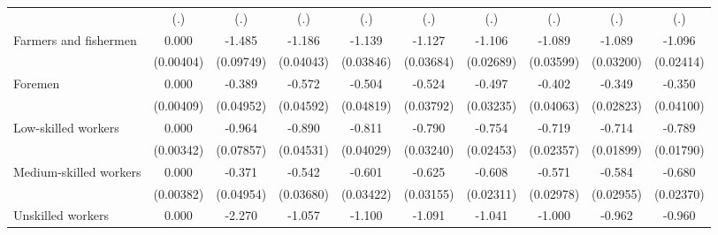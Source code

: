 {\begin{tabular}{l*{9}{c}}
                    &         (.)         &         (.)         &         (.)         &         (.)         &         (.)         &         (.)         &         (.)         &         (.)         &         (.)         \\
Farmers and fishermen&       0.000         &      -1.485\sym{***}&      -1.186\sym{***}&      -1.139\sym{***}&      -1.127\sym{***}&      -1.106\sym{***}&      -1.089\sym{***}&      -1.089\sym{***}&      -1.096\sym{***}\\
                    &   (0.00404)         &   (0.09749)         &   (0.04043)         &   (0.03846)         &   (0.03684)         &   (0.02689)         &   (0.03599)         &   (0.03200)         &   (0.02414)         \\
Foremen             &       0.000         &      -0.389\sym{***}&      -0.572\sym{***}&      -0.504\sym{***}&      -0.524\sym{***}&      -0.497\sym{***}&      -0.402\sym{***}&      -0.349\sym{***}&      -0.350\sym{***}\\
                    &   (0.00409)         &   (0.04952)         &   (0.04592)         &   (0.04819)         &   (0.03792)         &   (0.03235)         &   (0.04063)         &   (0.02823)         &   (0.04100)         \\
Low-skilled workers &       0.000         &      -0.964\sym{***}&      -0.890\sym{***}&      -0.811\sym{***}&      -0.790\sym{***}&      -0.754\sym{***}&      -0.719\sym{***}&      -0.714\sym{***}&      -0.789\sym{***}\\
                    &   (0.00342)         &   (0.07857)         &   (0.04531)         &   (0.04029)         &   (0.03240)         &   (0.02453)         &   (0.02357)         &   (0.01899)         &   (0.01790)         \\
Medium-skilled workers&       0.000         &      -0.371\sym{***}&      -0.542\sym{***}&      -0.601\sym{***}&      -0.625\sym{***}&      -0.608\sym{***}&      -0.571\sym{***}&      -0.584\sym{***}&      -0.680\sym{***}\\
                    &   (0.00382)         &   (0.04954)         &   (0.03680)         &   (0.03422)         &   (0.03155)         &   (0.02311)         &   (0.02978)         &   (0.02955)         &   (0.02370)         \\
Unskilled workers   &       0.000         &      -2.270\sym{***}&      -1.057\sym{***}&      -1.100\sym{***}&      -1.091\sym{***}&      -1.041\sym{***}&      -1.000\sym{***}&      -0.962\sym{***}&      -0.960\sym{***}\\

\end{tabular}}
